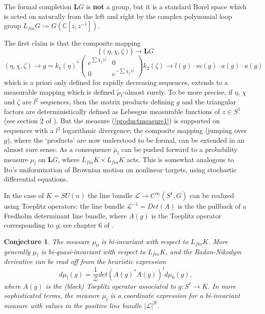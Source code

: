 \documentclass{amsart}
\theoremstyle{conjecture}
\newtheorem{conjecture}{Conjecture}
\theoremstyle{definition}
\theoremstyle{question}
\theoremstyle{questions}
\theoremstyle{remark}
\theoremstyle{remarks}
\theoremstyle{example}
\numberwithin{equation}{section}
\begin{document}
The formal completion $\mathbf LG$ is {\bf not} a group, but it is a standard
Borel space which is acted on
naturally from the left and right by the complex polynomial loop
group $L_{fin}G:=G(\mathbb C[z,z^{-1}])$.

The first claim is that the composite mapping
\begin{equation}\label{mapping}\{(\eta,\chi,\zeta)\} \to \mathbf
LG \end{equation}
$$(\eta,\chi,\zeta) \to g=k_1(\eta)^*\left(\begin{matrix}e^{\sum\chi_jz^j}&0\\0&e^{-\sum\chi_jz^j}\end{matrix}\right)k_2(\zeta)
\to l(g)\cdot m(g)\cdot a(g)\cdot u(g)$$ which is a priori only
defined for rapidly decreasing sequences, extends to a measurable
mapping which is defined $\tilde{\mu}_l$-almost surely. To be more precise, if $\eta$, $\chi$ and $\zeta$
are $l^2$ sequences, then the matrix products defining $g$ and the triangular factors
are deterministically defined as Lebesgue measurable functions of $z\in S^1$ (see section 2 of \cite{BP2}). But the measure (\ref{productmeasure1}) is
supported on sequences with a $l^2$ logarithmic divergence; the composite mapping
(jumping over $g$), where the `products' are now understood to be formal,
can be extended in an almost sure sense. As a consequence
$\tilde{\mu}_l$ can be pushed forward to a probability measure
$\mu_l$ on $\mathbf LG$, where $L_{fin}K \times
L_{fin}K$ acts. This is somewhat analogous to Ito's
uniformization of Brownian motion on nonlinear targets, using
stochastic differential equations.


In the case of $K=SU(n)$ the line bundle $\mathcal L\to C^{\infty}(S^1,G)$
can be realized using Toeplitz operators: the line bundle $\mathcal L^{-1}=Det(A)$
is the the pullback of a Fredholm determinant line bundle, where $A(g)$ is the Toeplitz operator
corresponding to $g$; see chapter 6 of \cite{PS}.

\begin{conjecture}\label{conj5} The measure $\mu_0$ is bi-invariant
with respect to $L_{fin}K$. More generally $\mu_l$
is bi-quasi-invariant with respect to $L_{fin}K$, and
the Radon-Nikodym derivative can be read off from the heuristic
expression
\begin{equation}\label{heuristic}d\mu_l(g)=\frac 1{\mathcal Z}det(A(g)^*A(g))^{l}d\mu_0
(g),\end{equation} where $A(g)$ is the (block) Toeplitz operator
associated to $g:S^1 \to K$. In more sophisticated terms, the
measure $\mu_l$ is a coordinate expression for a bi-invariant
measure with values in the positive line bundle $|\mathcal L|^{2l}$.

\end{conjecture}
\end{document}
